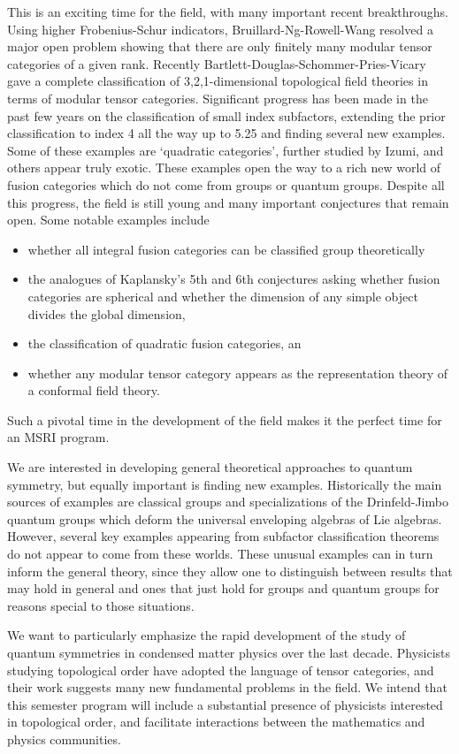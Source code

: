 \documentclass[11pt]{article}
\begin{document}
This is an exciting time for the field, with many important recent breakthroughs. Using higher Frobenius-Schur indicators, Bruillard-Ng-Rowell-Wang resolved a major open problem showing that there are only finitely many modular tensor categories of a given rank. Recently Bartlett-Douglas-Schommer-Pries-Vicary gave a complete classification of 3,2,1-dimensional topological field theories in terms of modular tensor categories. Significant progress has been made in the past few years on the classification of small index subfactors, extending the prior classification to index 4 all the way up to 5.25 and finding several new examples. Some of these examples are `quadratic categories', further studied by Izumi, and others appear truly exotic. These examples open the way to a rich new world of fusion categories which do not come from groups or quantum groups.  Despite all this progress, the field is still young and many important conjectures that remain open. Some notable examples include
\begin{itemize}
\item whether all integral fusion categories can be classified group theoretically
\item the analogues of Kaplansky's 5th and 6th conjectures asking whether fusion categories are spherical and whether the dimension of any simple object divides the global dimension,
\item the classification of quadratic fusion categories, an
\item whether any modular tensor category appears as the representation theory of a conformal field theory.
\end{itemize}
Such a pivotal time in the development of the field makes it the perfect time for an MSRI program.

We are interested in developing general theoretical approaches to quantum symmetry, but equally important is finding new examples. Historically the main sources of examples are classical groups and specializations of the Drinfeld-Jimbo quantum groups which deform the universal enveloping algebras of Lie algebras. However, several key examples appearing from subfactor classification theorems do not appear to come from these worlds. These unusual examples can in turn inform the general theory, since they allow one to distinguish between results that may hold in general and ones that just hold for groups and quantum groups for reasons special to those situations.

We want to particularly emphasize the rapid development of the study of quantum symmetries in condensed matter physics over the last decade. Physicists studying topological order have adopted the language of tensor categories, and their work suggests many new fundamental problems in the field. We intend that this semester program will include a substantial presence of physicists interested in topological order, and facilitate interactions between the mathematics and physics communities.
\end{document}
